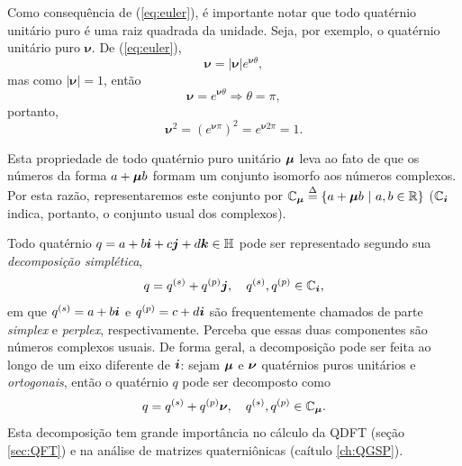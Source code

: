 Como consequ\^encia de (\ref{eq:euler}), \'e importante notar que todo quat\'ernio unit\'ario puro \'e uma raiz quadrada da unidade. Seja, por exemplo, o quat\'ernio unit\'ario puro $ \mathbf{\nu} $. De (\ref{eq:euler}),
\begin{equation}
\mathbf{\nu} = |\mathbf{\nu}| e^{\mathbf{\nu} \theta},
\end{equation}
mas como $ |\mathbf{\nu}| = 1 $, ent\~ao
\begin{equation}
\mathbf{\nu} = e^{\mathbf{\nu} \theta} \Rightarrow \theta = \pi,
\end{equation}
portanto,
\begin{equation}
\mathbf{\nu}^2 = \left( e^{\mathbf{\nu}\pi} \right)^2 = e^{\mathbf{\nu} 2\pi} = 1.
\end{equation}

Esta propriedade de todo quat\'ernio puro unit\'ario $ \boldsymbol{\mu} $ leva ao fato de que os n\'umeros da forma $ a + \boldsymbol{\mu} b  $ formam um conjunto isomorfo aos n\'umeros complexos. Por esta raz\~ao, representaremos este conjunto por $ \mathbb{C}_{\boldsymbol{\mu}} \overset{\Delta}{=} \{ a + \boldsymbol{\mu} b \ |\  a, b \in \mathbb{R} \}$ ($ \mathbb{C}_{\boldsymbol{i}} $ indica, portanto, o conjunto usual dos complexos).

Todo quat\'ernio $ q = a + b\boldsymbol{i} + c\boldsymbol{j} + d\boldsymbol{k} \in \mathbb{H} $ pode ser representado segundo sua \emph{decomposi\c c\~ao simpl\'etica},
\begin{equation}
q = q^{(s)} + q^{(p)} \boldsymbol{j}, \quad q^{(s)}, q^{(p)} \in \mathbb{C}_{\boldsymbol{i}},
\end{equation}
em que $ q^{(s)} = a + b\boldsymbol{i} $ e $ q^{(p)} = c + d\boldsymbol{i} $ s\~ao frequentemente chamados de parte \emph{simplex} e \emph{perplex}, respectivamente. Perceba que essas duas componentes s\~ao n\'umeros complexos usuais. De forma geral, a decomposi\c c\~ao pode ser feita ao longo de um eixo diferente de $ \boldsymbol{i} $: sejam $ \boldsymbol{\mu} $ e $ \boldsymbol{\nu} $ quat\'ernios puros unit\'arios e \emph{ortogonais}, ent\~ao o quat\'ernio $ q $ pode ser decomposto como
\begin{equation}
\label{eq:decomposicao}
q = q^{(s)} + q^{(p)} \boldsymbol{\nu}, \quad q^{(s)}, q^{(p)} \in \mathbb{C}_{\boldsymbol{\mu}}.
\end{equation}
Esta decomposi\c c\~ao tem grande import\^ancia no c\'alculo da QDFT (se\c c\~ao \ref{sec:QFT}) e na an\'alise de matrizes quaterni\^onicas (ca\'itulo \ref{ch:QGSP}).


